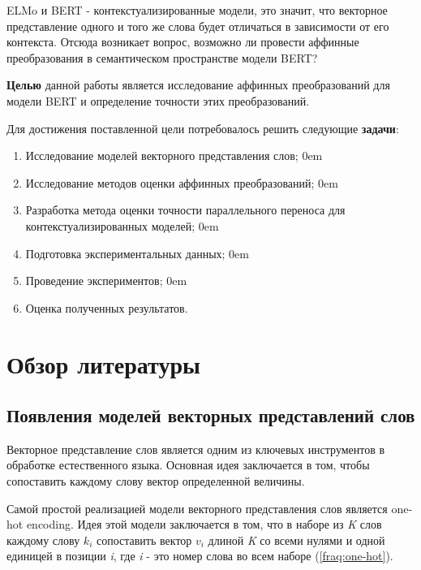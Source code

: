 \documentclass[a4paper,14pt]{article}
\begin{document}
ELMo и BERT - контекстуализированные модели, это значит, что векторное представление одного и того же слова будет отличаться в зависимости от его контекста.
Отсюда возникает вопрос, возможно ли провести аффинные преобразования в семантическом пространстве модели BERT?

\textbf{Целью} данной работы является исследование аффинных преобразований для модели BERT и определение точности этих преобразований.

Для достижения поставленной цели потребовалось решить следующие \textbf{задачи}:

\begin{enumerate}
	\itemsep0em 
	\item Исследование моделей векторного представления слов;
		\itemsep0em 
	\item Исследование методов оценки аффинных преобразований;
		\itemsep0em 
	\item Разработка метода оценки точности параллельного переноса для контекстуализированных моделей;
		\itemsep0em 
	\item Подготовка экспериментальных данных;
		\itemsep0em 
	\item Проведение экспериментов;
		\itemsep0em 
	\item Оценка полученных результатов.

\end{enumerate}

\newpage


\section{Обзор литературы}

\subsection{Появления моделей векторных представлений слов}

Векторное представление слов является одним из ключевых инструментов в обработке естественного языка.
Основная идея заключается в том, чтобы сопоставить каждому слову вектор определенной величины.

Самой простой реализацией модели векторного представления слов является one-hot encoding.
Идея этой модели заключается в том, что в наборе из \textit{K} слов каждому слову $k_i$ сопоставить вектор $v_i$ длиной \textit{K} со всеми нулями и одной единицей в позиции \textit{i}, где \textit{i} - это номер слова во всем наборе (\ref{fraq:one-hot}).
\end{document}
